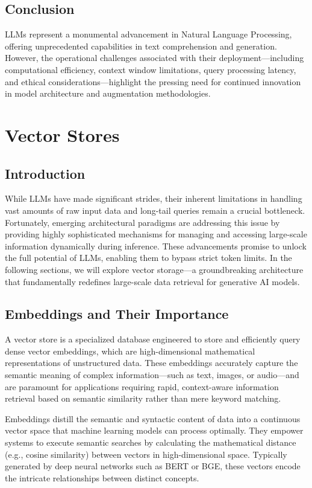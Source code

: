 \subsection{Conclusion}
LLMs represent a monumental advancement in Natural Language Processing, offering unprecedented capabilities in text comprehension and generation. However, the operational challenges associated with their deployment—including computational efficiency, context window limitations, query processing latency, and ethical considerations—highlight the pressing need for continued innovation in model architecture and augmentation methodologies.

\section{Vector Stores}

\subsection{Introduction}
While LLMs have made significant strides, their inherent limitations in handling vast amounts of raw input data and long-tail queries remain a crucial bottleneck. Fortunately, emerging architectural paradigms are addressing this issue by providing highly sophisticated mechanisms for managing and accessing large-scale information dynamically during inference. These advancements promise to unlock the full potential of LLMs, enabling them to bypass strict token limits. In the following sections, we will explore vector storage—a groundbreaking architecture that fundamentally redefines large-scale data retrieval for generative AI models.

\subsection{Embeddings and Their Importance}
A vector store is a specialized database engineered to store and efficiently query dense vector embeddings, which are high-dimensional mathematical representations of unstructured data. These embeddings accurately capture the semantic meaning of complex information—such as text, images, or audio—and are paramount for applications requiring rapid, context-aware information retrieval based on semantic similarity rather than mere keyword matching.

Embeddings distill the semantic and syntactic content of data into a continuous vector space that machine learning models can process optimally. They empower systems to execute semantic searches by calculating the mathematical distance (e.g., cosine similarity) between vectors in high-dimensional space. Typically generated by deep neural networks such as BERT or BGE, these vectors encode the intricate relationships between distinct concepts. 


